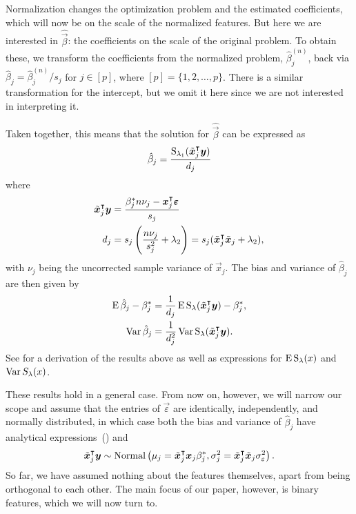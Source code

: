 Normalization changes the optimization problem and the estimated coefficients, which will
now be on the scale of the normalized features. But here we are interested in
\(\hat{\vec{\beta}}\): the coefficients on the scale of the original problem. To obtain
these, we transform the coefficients from the normalized problem, \(\hat\beta^{(n)}_j\),
back via \(\hat\beta_j = \hat\beta^{(n)}_j/s_j\) for \(j \in [p]\), where \([p] =
\{1,2,\dots,p\}\). There is a similar transformation for the intercept, but we omit it here
since we are not interested in interpreting it.

Taken together, this means that the solution for \(\hat{\vec{\beta}}\) can be expressed as
\[
  \hat{\beta}_j = \frac{\operatorname{S}_{\lambda_1}(\tilde{\bm{x}}_j^\intercal \bm{y})}{d_j}
\]
where
\begin{equation}
  \label{eq:z-d}
  \begin{aligned}
    \tilde{\bm{x}}_j^\intercal \bm{y} & = \frac{\beta_j^* n \nu_j- \bm{x}_j^\intercal \bm{\varepsilon}}{s_j}                \\
    d_j                          & = s_j\left(\frac{n \nu_j}{s_j^2} + \lambda_2\right) = s_j(\tilde{\bm{x}}_j^\intercal
    \tilde{\bm{x}}_j + \lambda_2),
  \end{aligned}
\end{equation}
with \(\nu_j\) being the uncorrected sample variance of \(\vec{x}_j\).
The bias and variance of \(\hat{\beta}_j\) are then given by
\begin{align}
  \operatorname{E} \hat\beta_j - \beta_j^* & = \frac{1}{d_j}\operatorname{E} \operatorname{S}_\lambda(\tilde{\bm{x}}_j^\intercal \bm{y}) - \beta^*_j,\label{eq:bias} \\
  \operatorname{Var} \hat\beta_j           & = \frac{1}{d_j^2} \operatorname{Var} \operatorname{S}_\lambda(\tilde{\bm{x}}_j^\intercal \bm{y}).\label{eq:variance}
\end{align}
See  for a derivation of the results above
as well as expressions for \(\operatorname{E} \operatorname{S}_\lambda(x)\) and \(\operatorname{Var} S_\lambda(x)\).

These results hold in a general case. From now on, however, we will narrow our scope and
assume that the entries of \(\vec{\varepsilon}\) are identically, independently, and
normally distributed, in which case both the bias and variance of \(\hat{\beta}_j\) have
analytical expressions~() and
\[
  \tilde{\bm{x}}_j^\intercal \bm{y} \sim \operatorname{Normal}\left(\mu_j = \tilde{\bm{x}}_j^\intercal\bm{x}_j \beta_j^*, \sigma_j^2 = \tilde{\bm{x}}_j^\intercal\tilde{\bm{x}}_j \sigma_\varepsilon^2 \right).
\]
So far, we have assumed nothing about the features themselves, apart from being orthogonal
to each other. The main focus of our paper, however, is binary features, which we will now
turn to.


